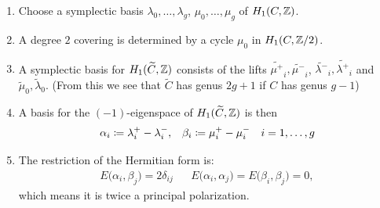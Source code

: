 \begin{frame}
    

\begin{enumerate}[<+->]
	\item Choose a symplectic basis $\lambda_0, \ldots, \lambda_g$, $\mu_0, \ldots, \mu_g$ of $H_1(C,\mathbb{Z})$.

	\item A degree $2$ covering is determined by a cycle $\mu_0$ in $H_1(C, \mathbb{Z}/2)$.

	\item A symplectic basis for $H_1(\widetilde C, \mathbb{Z})$ consists of the lifts $\widetilde{\mu^+}_i, \widetilde{\mu^-}_i$, $\widetilde{\lambda^-}_i, \widetilde{\lambda^+}_i$ and $\widetilde{\mu}_0, \widetilde{\lambda}_0$. (From this we see that $\widetilde C$ has genus $2g+1$ if $C$ has genus $g-1$)

	\item A basis for the $(-1)$-eigenspace of $H_1(\widetilde C,\mathbb{Z})$ is then
	\begin{align*}
	\alpha_i \coloneqq \lambda_i^+ - \lambda_i^-, && \beta_i \coloneqq \mu_i^+ - \mu_i^- && i=1,\ldots, g
	\end{align*}

	\item The restriction of the Hermitian form is:
	\begin{align*}
	E\big(\alpha_i,\beta_j\big)= 2 \delta_{ij} && E\big(\alpha_i, \alpha_j\big) = E\big(\beta_i,\beta_j\big)=0,
	\end{align*}
	which means it is twice a principal polarization.
\end{enumerate}


\end{frame}